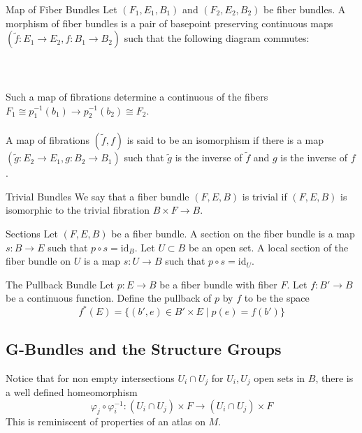 \documentclass[a4paper]{article}
\begin{document}
\begin{defn}{Map of Fiber Bundles}{} Let $(F_1,E_1,B_1)$ and $(F_2,E_2,B_2)$ be fiber bundles. A morphism of fiber bundles is a pair of basepoint preserving continuous maps $(\tilde{f}:E_1\to E_2,f:B_1\to B_2)$ such that the following diagram commutes: \\~\\
\\~\\
Such a map of fibrations determine a continuous of the fibers $F_1\cong p_1^{-1}(b_1)\to p_2^{-1}(b_2)\cong F_2$. \\~\\

A map of fibrations $(\tilde{f},f)$ is said to be an isomorphism if there is a map $(\tilde{g}:E_2\to E_1,g:B_2\to B_1)$ such that $\tilde{g}$ is the inverse of $\tilde{f}$ and $g$ is the inverse of $f$. 
\end{defn}

\begin{defn}{Trivial Bundles}{} We say that a fiber bundle $(F,E,B)$ is trivial if $(F,E,B)$ is isomorphic to the trivial fibration $B\times F\to B$. 
\end{defn}

\begin{defn}{Sections}{} Let $(F,E,B)$ be a fiber bundle. A section on the fiber bundle is a map $s:B\to E$ such that $p\circ s=\text{id}_B$. Let $U\subset B$ be an open set. A local section of the fiber bundle on $U$ is a map $s:U\to B$ such that $p\circ s=\text{id}_U$. 
\end{defn}

\begin{defn}{The Pullback Bundle}{} Let $p:E\to B$ be a fiber bundle with fiber $F$. Let $f:B'\to B$ be a continuous function. Define the pullback of $p$ by $f$ to be the space $$f^\ast(E)=\{(b',e)\in B'\times E\;|\;p(e)=f(b')\}$$
\end{defn}

\subsection{G-Bundles and the Structure Groups}
Notice that for non empty intersections $U_i\cap U_j$ for $U_i,U_j$ open sets in $B$, there is a well defined homeomorphism $$\varphi_j\circ\varphi_i^{-1}:(U_i\cap U_j)\times F\to(U_i\cap U_j)\times F$$ This is reminiscent of properties of an atlas on $M$. 
\end{document}

